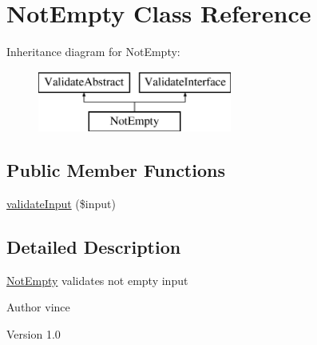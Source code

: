 \hypertarget{class_anemo_1_1_validate_1_1_adapter_1_1_not_empty}{
\section{NotEmpty Class Reference}
\label{class_anemo_1_1_validate_1_1_adapter_1_1_not_empty}
}
Inheritance diagram for NotEmpty:\begin{figure}[H]
\begin{center}
\leavevmode
\includegraphics[height=2.000000cm]{class_anemo_1_1_validate_1_1_adapter_1_1_not_empty}
\end{center}
\end{figure}
\subsection*{Public Member Functions}
\begin{DoxyCompactItemize}
\item 
\hyperlink{class_anemo_1_1_validate_1_1_adapter_1_1_not_empty_aaa5a5ce40dbb70cc1caa4482c0b7aa33}{validateInput} (\$input)
\end{DoxyCompactItemize}


\subsection{Detailed Description}
\hyperlink{class_anemo_1_1_validate_1_1_adapter_1_1_not_empty}{NotEmpty} validates not empty input \begin{DoxyAuthor}{Author}
vince 
\end{DoxyAuthor}
\begin{DoxyVersion}{Version}
1.0 
\end{DoxyVersion}



